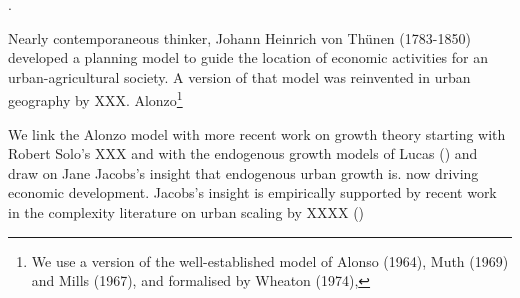 . %

Nearly contemporaneous thinker, Johann Heinrich  von Th\"unen (1783-1850) developed a planning model to guide the location of economic activities for an urban-agricultural society.  A version of that model  was reinvented in urban geography by XXX. Alonzo\footnote{We use a version of the well-established model of Alonso (1964), Muth (1969) and Mills (1967), and formalised by Wheaton (1974),} %

We link the Alonzo model with more recent work on growth theory starting with Robert Solo's XXX and with the endogenous growth models of Lucas () and draw on Jane Jacobs's insight that endogenous urban growth  is. now driving economic development. Jacobs's insight is empirically supported by recent work in the complexity literature on urban scaling by XXXX ()



